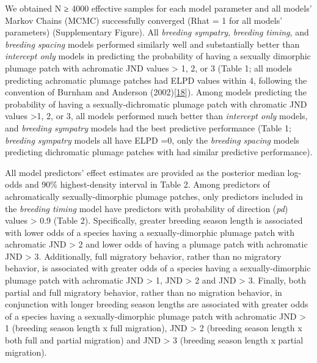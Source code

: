 \documentclass[
  a4paper,
]{article}
\begin{document}
We obtained N ≥ 4000 effective samples for each model parameter and all
models' Markov Chains (MCMC) successfully converged (Rhat = 1 for all
models' parameters) (Supplementary Figure). All \emph{breeding
sympatry}, \emph{breeding timing}, and \emph{breeding spacing} models
performed similarly well and substantially better than \emph{intercept
only} models in predicting the probability of having a sexually
dimorphic plumage patch with achromatic JND values \textgreater{} 1, 2,
or 3 (Table 1; all models predicting achromatic plumage patches had ELPD
values within 4, following the convention of Burnham and Anderson
(2002){[}\protect\hyperlink{ref-burnham2002}{18}{]}). Among models
predicting the probability of having a sexually-dichromatic plumage
patch with chromatic JND values \textgreater1, 2, or 3, all models
performed much better than \emph{intercept only} models, and
\emph{breeding sympatry} models had the best predictive performance
(Table 1; \emph{breeding sympatry} models all have ELPD =0, only the
\emph{breeding spacing} models predicting dichromatic plumage patches
with had similar predictive performance).

All model predictors' effect estimates are provided as the posterior
median log-odds and 90\% highest-density interval in Table 2. Among
predictors of achromatically sexually-dimorphic plumage patches, only
predictors included in the \emph{breeding timing} model have predictors
with probability of direction (\emph{pd}) values \textgreater{} 0.9
(Table 2). Specifically, greater breeding season length is associated
with lower odds of a species having a sexually-dimorphic plumage patch
with achromatic JND \textgreater{} 2 and lower odds of having a plumage
patch with achromatic JND \textgreater{} 3. Additionally, full migratory
behavior, rather than no migratory behavior, is associated with greater
odds of a species having a sexually-dimorphic plumage patch with
achromatic JND \textgreater{} 1, JND \textgreater{} 2 and JND
\textgreater{} 3. Finally, both partial and full migratory behavior,
rather than no migration behavior, in conjunction with longer breeding
season lengths are associated with greater odds of a species having a
sexually-dimorphic plumage patch with achromatic JND \textgreater{} 1
(breeding season length x full migration), JND \textgreater{} 2
(breeding season length x both full and partial migration) and JND
\textgreater{} 3 (breeding season length x partial migration).
\end{document}
